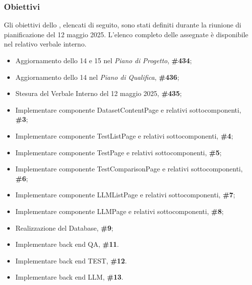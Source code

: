 \subsubsection{Obiettivi}
\label{sec:obiettivi_sprint15}

Gli obiettivi dello , elencati di seguito, sono stati definiti durante la riunione di pianificazione del 12 maggio 2025.
L'elenco completo delle  assegnate è disponibile nel relativo verbale interno.

\begin{itemize}
    \item Aggiornamento dello  14 e 15 nel \textit{Piano di Progetto},  \textbf{\#434};
    \item Aggiornamento dello  14 nel \textit{Piano di Qualifica},  \textbf{\#436};
    \item Stesura del Verbale Interno del 12 maggio 2025,  \textbf{\#435};
    \item Implementare componente DatasetContentPage e relativi sottocomponenti,  \textbf{\#3};
    \item Implementare componente TestListPage e relativi sottocomponenti,  \textbf{\#4};
    \item Implementare componente TestPage e relativi sottocomponenti,  \textbf{\#5};
    \item Implementare componente TestComparisonPage e relativi sottocomponenti,  \textbf{\#6};
    \item Implementare componente LLMListPage e relativi sottocomponenti,  \textbf{\#7};
    \item Implementare componente LLMPage e relativi sottocomponenti,  \textbf{\#8};
    \item Realizzazione del Database,  \textbf{\#9};
    \item Implementare back end QA,  \textbf{\#11}.
    \item Implementare back end TEST,  \textbf{\#12}.
    \item Implementare back end LLM,  \textbf{\#13}.
\end{itemize}